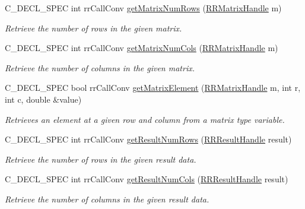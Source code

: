 \begin{DoxyCompactItemize}
\item 
\-C\-\_\-\-D\-E\-C\-L\-\_\-\-S\-P\-E\-C int rr\-Call\-Conv \hyperlink{group__loadsave_gad5a3803c72d8f27bf2dad72b25226675}{get\-Matrix\-Num\-Rows} (\hyperlink{rr__c__types_8h_a87174eefa58ae98dec58c9253ae6c5da}{\-R\-R\-Matrix\-Handle} m)
\begin{DoxyCompactList}\small\item\em \-Retrieve the number of rows in the given matrix. \end{DoxyCompactList}\item 
\-C\-\_\-\-D\-E\-C\-L\-\_\-\-S\-P\-E\-C int rr\-Call\-Conv \hyperlink{group__loadsave_ga46eae843e223f83e00b07fe7563a1c91}{get\-Matrix\-Num\-Cols} (\hyperlink{rr__c__types_8h_a87174eefa58ae98dec58c9253ae6c5da}{\-R\-R\-Matrix\-Handle} m)
\begin{DoxyCompactList}\small\item\em \-Retrieve the number of columns in the given matrix. \end{DoxyCompactList}\item 
\-C\-\_\-\-D\-E\-C\-L\-\_\-\-S\-P\-E\-C bool rr\-Call\-Conv \hyperlink{group__loadsave_gac4bd2fdc7fd7d3a1f52ef59975952dad}{get\-Matrix\-Element} (\hyperlink{rr__c__types_8h_a87174eefa58ae98dec58c9253ae6c5da}{\-R\-R\-Matrix\-Handle} m, int r, int c, double \&value)
\begin{DoxyCompactList}\small\item\em \-Retrieves an element at a given row and column from a matrix type variable. \end{DoxyCompactList}\item 
\-C\-\_\-\-D\-E\-C\-L\-\_\-\-S\-P\-E\-C int rr\-Call\-Conv \hyperlink{group__loadsave_ga45793ae8175e37d42bb0fed8629cedb3}{get\-Result\-Num\-Rows} (\hyperlink{rr__c__types_8h_a8c364bbdef9aab31c89655c38461da51}{\-R\-R\-Result\-Handle} result)
\begin{DoxyCompactList}\small\item\em \-Retrieve the number of rows in the given result data. \end{DoxyCompactList}\item 
\-C\-\_\-\-D\-E\-C\-L\-\_\-\-S\-P\-E\-C int rr\-Call\-Conv \hyperlink{group__loadsave_gac8e0a87e6231d8f5828b679116b2d6a7}{get\-Result\-Num\-Cols} (\hyperlink{rr__c__types_8h_a8c364bbdef9aab31c89655c38461da51}{\-R\-R\-Result\-Handle} result)
\begin{DoxyCompactList}\small\item\em \-Retrieve the number of columns in the given result data. \end{DoxyCompactList}\item 

\end{DoxyCompactItemize}
